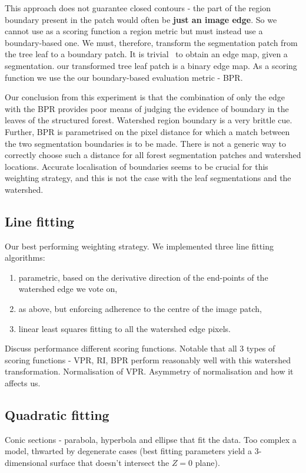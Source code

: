 This approach does not guarantee closed contours - the part of the region boundary present in the patch would often be \textbf{just an image edge}. So we cannot use as a scoring function a region metric but must instead use a boundary-based one. We must, therefore, transform the segmentation patch from the tree leaf to a boundary patch. It is trivial~\cite{Arbelaez11} to obtain an edge map, given a segmentation. our transformed tree leaf patch is a binary edge map. As a scoring function we use the our boundary-based evaluation metric - BPR.

Our conclusion from this experiment is that the combination of only the edge with the BPR provides poor means of judging the evidence of boundary in the leaves of the structured forest. Watershed region boundary is a very brittle cue. Further, BPR is parametrised on the pixel distance for which a match between the two segmentation boundaries is to be made. There is not a generic way to correctly choose such a distance for all forest segmentation patches and watershed locations. Accurate localisation of boundaries seems to be crucial for this weighting strategy, and this is not the case with the leaf segmentations and the watershed.

\subsection{Line fitting}
Our best performing weighting strategy. We implemented three line fitting algorithms:
\begin{enumerate}
  \item parametric, based on the derivative direction of the end-points of the watershed edge we vote on,
  \item as above, but enforcing adherence to the centre of the image patch,
  \item linear least squares fitting to all the watershed edge pixels.
\end{enumerate}

Discuss performance \wrt different scoring functions. Notable that all 3 types of scoring functions - VPR, RI, BPR perform reasonably well with this watershed transformation. Normalisation of VPR. Asymmetry of normalisation and how it affects us.

\subsection{Quadratic fitting} %
Conic sections - parabola, hyperbola and ellipse that fit the data. Too complex a model, thwarted by degenerate cases (best fitting parameters yield a 3-dimensional surface that doesn't intersect the $Z=0$ plane).


